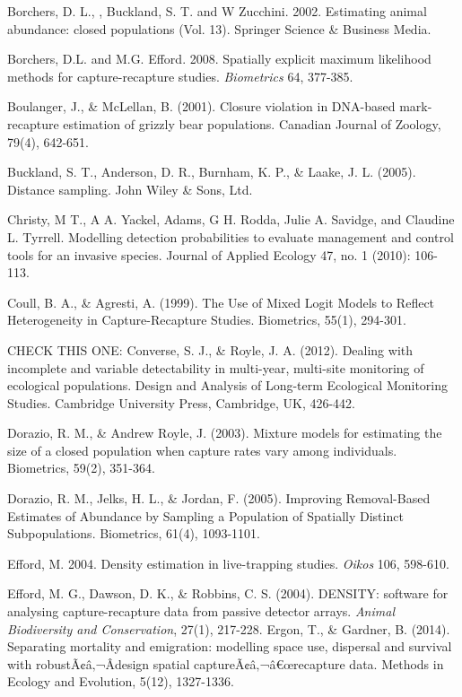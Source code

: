 \documentclass{book}
\begin{document}
\rf Borchers, D. L., , Buckland, S. T.  and W Zucchini. 2002. Estimating animal abundance: closed populations (Vol. 13). Springer Science \& Business Media.

\rf Borchers, D.L. and M.G. Efford. 2008. Spatially explicit maximum likelihood methods for capture-recapture studies. {\it Biometrics} 64, 377-385.

\rf Boulanger, J., \& McLellan, B. (2001). Closure violation in DNA-based mark-recapture estimation of grizzly bear populations. Canadian Journal of Zoology, 79(4), 642-651.

\rf Buckland, S. T., Anderson, D. R., Burnham, K. P., \& Laake, J. L. (2005). Distance sampling. John Wiley \& Sons, Ltd.

\rf Christy, M T., A A. Yackel, Adams, G H. Rodda, Julie A. Savidge, and Claudine L. Tyrrell. Modelling detection probabilities to evaluate management and control tools for an invasive species. Journal of Applied Ecology 47, no. 1 (2010): 106-113.

\rf Coull, B. A., \& Agresti, A. (1999). The Use of Mixed Logit Models to Reflect Heterogeneity in Capture-Recapture Studies. Biometrics, 55(1), 294-301.

CHECK THIS ONE:
\rf Converse, S. J., \& Royle, J. A. (2012). Dealing with incomplete and variable detectability in multi-year, multi-site monitoring of ecological populations. Design and Analysis of Long-term Ecological Monitoring Studies. Cambridge University Press, Cambridge, UK, 426-442.

\rf Dorazio, R. M., \& Andrew Royle, J. (2003). Mixture models for estimating the size of a closed population when capture rates vary among individuals. Biometrics, 59(2), 351-364.

\rf Dorazio, R. M., Jelks, H. L., \& Jordan, F. (2005). Improving Removal-Based Estimates of Abundance by Sampling a Population of Spatially Distinct Subpopulations. Biometrics, 61(4), 1093-1101.

\rf Efford, M. 2004. Density estimation in live-trapping studies. {\it Oikos}  106, 598-610.

\rf Efford, M. G., Dawson, D. K., \& Robbins, C. S. (2004). DENSITY: software for analysing capture-recapture data from passive detector arrays. \textit{Animal Biodiversity and Conservation}, 27(1), 217-228.
\rf Ergon, T., \& Gardner, B. (2014). Separating mortality and emigration: modelling space use, dispersal and survival with robustÃ¢â‚¬Âdesign spatial captureÃ¢â‚¬â€œrecapture data. Methods in Ecology and Evolution, 5(12), 1327-1336.
\end{document}
